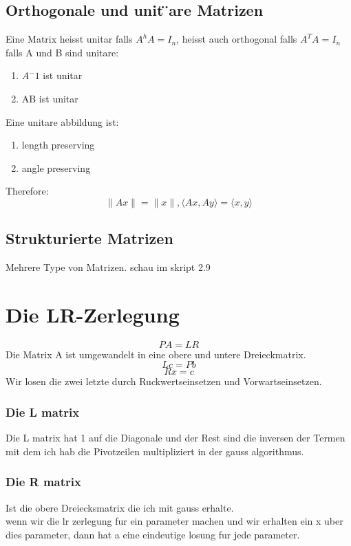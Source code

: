 \documentclass[11pt]{article}
\begin{document}
\subsection{Orthogonale und unit ̈are Matrizen}
Eine Matrix heisst unitar falls $A^hA = I_n$, heisst auch orthogonal falls $A^TA = I_n$\\
falls A und B sind unitare:
\begin{enumerate}
	\item $A^-1$ ist unitar
	\item AB ist unitar
\end{enumerate}
Eine unitare abbildung ist:
\begin{enumerate}
	\item length preserving
	\item angle preserving
\end{enumerate}
Therefore:
\begin{equation}
	\parallel Ax\parallel = \parallel x\parallel,	\langle Ax, Ay\rangle = \langle x,y\rangle
\end{equation}
\subsection{Strukturierte Matrizen}
Mehrere Type von Matrizen. schau im skript 2.9
\section{Die LR-Zerlegung}
\begin{equation}
	PA=LR
\end{equation}
Die Matrix A ist umgewandelt in eine obere und untere Dreieckmatrix.
\begin{equation}
	Lc=Pb
\end{equation}
\begin{equation}
	Rx=c
\end{equation}
Wir losen die zwei letzte durch Ruckwertseinsetzen und Vorwartseinsetzen.
\subsubsection{Die L matrix}
Die L matrix hat 1 auf die Diagonale und der Rest sind die inversen der Termen mit dem ich hab die Pivotzeilen multipliziert in der gauss algorithmus.
\subsubsection{Die R matrix}
Ist die obere Dreiecksmatrix die ich mit gauss erhalte.\\
wenn wir die lr zerlegung fur ein parameter machen und wir erhalten ein x uber dies parameter, dann hat a eine eindeutige losung fur jede parameter.
\end{document}
